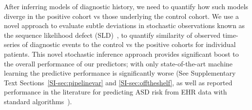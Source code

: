 \documentclass[onecolumn,10pt]{IEEEtran}
\def\treatment{positive\xspace}
\def\control{control\xspace}
\begin{document}
After inferring  models of diagnostic history, we need to quantify how such models diverge in the \treatment cohort vs those underlying the \control cohort.
We use a novel approach to evaluate subtle deviations in stochastic observations known as the sequence likelihood defect (SLD)~\cite{huang2019data}, to  quantify similarity of observed time-series of diagnostic events to the control vs the \treatment cohorts for individual patients. This novel stochastic inference approach provides  significant boost to the overall performance of our predictors; with only state-of-the-art machine learning  the predictive performance is significantly worse (See Supplementary Text Sections~\ref{SI-sec:pipelinevar} and \ref{SI-sec:offtheshelf}, as well as reported performance in the literature for predicting ASD risk from EHR data with standard algorithms~\cite{lingren2016electronic}).
\end{document}
